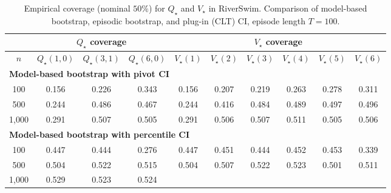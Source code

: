 \documentclass{article}
\numberwithin{equation}{section}
\begin{document}
\begin{table}[ht]
\centering
\caption{Empirical coverage (nominal $50\%$) for $Q_\star$ and $V_\star$ in RiverSwim. Comparison of model-based bootstrap, episodic bootstrap, and plug-in (CLT) CI, episode length $T=100$.}
\label{tab:riverswim-optimal-coverage-T100-50}
\begin{tabular}{c|ccc|cccccc}
\hline
& \multicolumn{3}{c|}{$Q_\star$ coverage} & \multicolumn{6}{c}{$V_\star$ coverage} \\ \hline
$n$
& $Q_\star(1,0)$ & $Q_\star(3,1)$ & $Q_\star(6,0)$
& $V_\star(1)$ & $V_\star(2)$ & $V_\star(3)$ & $V_\star(4)$ & $V_\star(5)$ & $V_\star(6)$ \\
\hline
\multicolumn{10}{l}{\textbf{Model-based bootstrap with pivot CI}} \\ \hline
100
& 0.156 & 0.226 & \cellcolor{covheat!22!white}0.343
& 0.156 & 0.207 & 0.219 & 0.263 & 0.278 & \cellcolor{covheat!6!white}0.311 \\
500
& 0.244 & \cellcolor{covheat!93!white}0.486 & \cellcolor{covheat!84!white}0.467
& 0.244 & \cellcolor{covheat!58!white}0.416 & \cellcolor{covheat!92!white}0.484 & \cellcolor{covheat!94!white}0.489 & \cellcolor{covheat!98!white}0.497 & \cellcolor{covheat!98!white}0.496 \\
1{,}000
& 0.291 & \cellcolor{covheat!100!white}0.507 & \cellcolor{covheat!100!white}0.505
& 0.291 & \cellcolor{covheat!100!white}0.506 & \cellcolor{covheat!100!white}0.507 & \cellcolor{covheat!100!white}0.511 & \cellcolor{covheat!100!white}0.505 & \cellcolor{covheat!100!white}0.506 \\
\hline
\multicolumn{10}{l}{\textbf{Model-based bootstrap with percentile CI}} \\ \hline
100
& \cellcolor{covheat!74!white}0.447 & \cellcolor{covheat!72!white}0.444 & 0.276
& \cellcolor{covheat!74!white}0.447 & \cellcolor{covheat!76!white}0.451 & \cellcolor{covheat!72!white}0.444 & \cellcolor{covheat!76!white}0.452 & \cellcolor{covheat!77!white}0.453 & \cellcolor{covheat!20!white}0.339 \\
500
& \cellcolor{covheat!100!white}0.504 & \cellcolor{covheat!100!white}0.522 & \cellcolor{covheat!100!white}0.515
& \cellcolor{covheat!100!white}0.504 & \cellcolor{covheat!100!white}0.507 & \cellcolor{covheat!100!white}0.522 & \cellcolor{covheat!100!white}0.523 & \cellcolor{covheat!100!white}0.501 & \cellcolor{covheat!100!white}0.511 \\
1{,}000
& \cellcolor{covheat!100!white}0.529 & \cellcolor{covheat!100!white}0.523 & \cellcolor{covheat!100!white}0.524

\end{tabular}
\end{table}
\end{document}
